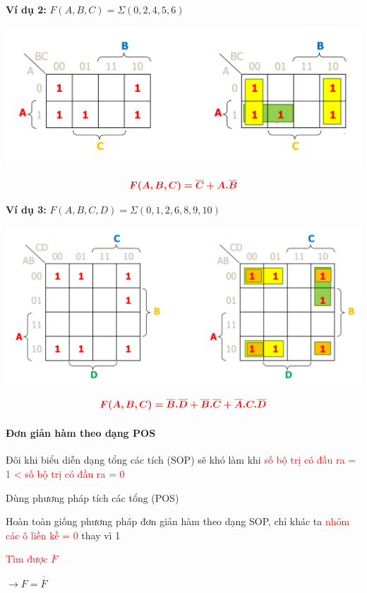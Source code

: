 \documentclass[12pt]{article}
\newcommand{\SubItem}[1]{
    {\setlength\itemindent{15pt} \item[-] #1}
}
\begin{document}
\begin{sloppypar}
\begin{tcolorbox}
    \textbf{Ví dụ 2:} \(F(A,B,C) = \Sigma(0,2,4,5,6)\)
\end{tcolorbox}

\includegraphics[width=15cm]{sop_ex2.png}

\begin{equation*}
    \color{red}
    \bm{F(A,B,C) = \overline{C} + A.\overline{B}}
\end{equation*}

\begin{tcolorbox}
    \textbf{Ví dụ 3:} \(F(A,B,C,D) = \Sigma(0,1,2,6,8,9,10)\)
\end{tcolorbox}

\includegraphics[width=15cm]{sop_ex3.png}

\begin{equation*}
    \color{red}
    \bm{F(A,B,C) = \overline{B}.\overline{D} + \overline{B}.\overline{C} + \overline{A}.C.\overline{D}}
\end{equation*}

\paragraph{Đơn giản hàm theo dạng POS}

\begin{itemize}
    \item Đôi khi biểu diễn dạng tổng các tích (SOP) sẽ khó làm khi \textcolor{red}{số bộ trị có đầu ra = 1 < số bộ trị có đầu ra = 0}
        \SubItem {Dùng phương pháp tích các tổng (POS)}
    \item Hoàn toàn giống phương pháp đơn giản hàm theo dạng SOP, chỉ khác ta \textcolor{red}{nhóm các ô liền kề = 0} thay vì 1
        \SubItem {\textcolor{red}{Tìm được \(\overline{F}\)}}
        \SubItem{\color{red}\(\rightarrow F = \overline{\overline{F}}\)}
\end{itemize}


\end{sloppypar}
\end{document}
